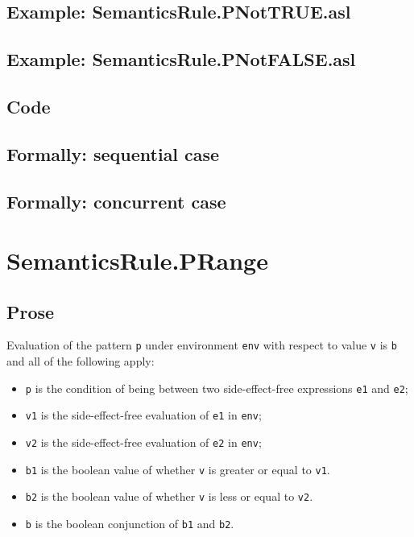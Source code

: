 \documentclass{book}
\begin{document}
    \subsection{Example: SemanticsRule.PNotTRUE.asl}

    \subsection{Example: SemanticsRule.PNotFALSE.asl}

  \subsection{Code}

\begin{emptyformal}
  \subsection{Formally: sequential case}

  \subsection{Formally: concurrent case}
\end{emptyformal}


\section{SemanticsRule.PRange \label{sec:SemanticsRule.PRange}}

    \subsection{Prose}
  Evaluation of the pattern \texttt{p} under environment \texttt{env} with
  respect to value \texttt{v} is \texttt{b} and all of the following apply:
    \begin{itemize}
      \item \texttt{p} is the condition of being between two side-effect-free expressions \texttt{e1} and \texttt{e2};
      \item \texttt{v1} is the side-effect-free evaluation of \texttt{e1} in \texttt{env};
      \item \texttt{v2} is the side-effect-free evaluation of \texttt{e2} in \texttt{env};
      \item \texttt{b1} is the boolean value of whether \texttt{v} is greater or equal to \texttt{v1}.
      \item \texttt{b2} is the boolean value of whether \texttt{v} is less or equal to \texttt{v2}.
      \item \texttt{b} is the boolean conjunction of \texttt{b1} and \texttt{b2}.
    \end{itemize}
\end{document}
